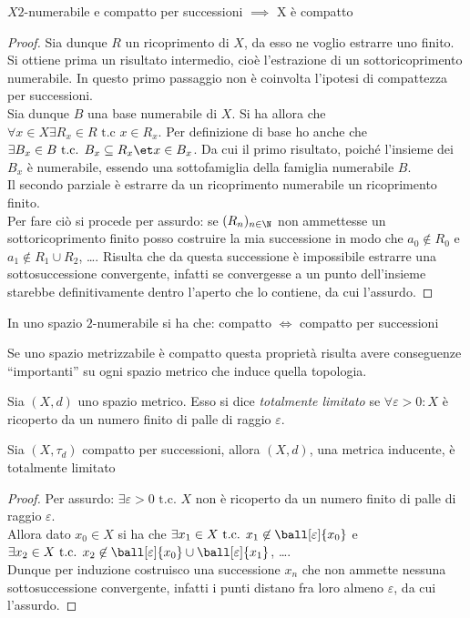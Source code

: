 \begin{prop}
$X 2$-numerabile e compatto per successioni $\implies$ X è compatto
\end{prop}
\begin{proof}
Sia dunque $R$ un ricoprimento di $X$, da esso ne voglio estrarre uno finito.\\
Si ottiene prima un risultato intermedio, cioè l'estrazione di un sottoricoprimento numerabile. In questo primo passaggio non è coinvolta l'ipotesi di compattezza per successioni.\\
Sia dunque $B$ una base numerabile di $X$. Si ha allora che $\forall x\in X \exists R_x \in R \text{ t.c } x\in R_x$. Per definizione di base ho anche che $\exists B_x \in B \text{ t.c. } B_x \subseteq R_x \et x\in B_x$. Da cui il primo risultato, poiché l'insieme dei $B_x$ è numerabile, essendo una sottofamiglia della famiglia numerabile $B$.\\
Il secondo parziale è estrarre da un ricoprimento numerabile un ricoprimento finito.\\
Per fare ciò si procede per assurdo: se $(R_n)_{n\in \N}$ non ammettesse un sottoricoprimento finito posso costruire la mia successione in modo che $a_0 \not \in R_0$ e $a_1 \not \in R_1 \cup R_2$, \dots . Risulta che da questa successione è impossibile estrarre una sottosuccessione convergente, infatti se convergesse a un punto dell'insieme starebbe definitivamente dentro l'aperto che lo contiene, da cui l'assurdo.
\end{proof}

\begin{cor}
In uno spazio $2$-numerabile si ha che: compatto $\iff$ compatto per successioni
\end{cor}

Se uno spazio metrizzabile è compatto questa proprietà risulta avere conseguenze ``importanti'' su ogni spazio metrico che induce quella topologia.

\begin{defn}
Sia $(X,d)$ uno spazio metrico. Esso si dice \emph{totalmente limitato} se $\forall \varepsilon > 0:X$ è ricoperto da un numero finito di palle di raggio $\varepsilon$.
\end{defn}

\begin{prop}
Sia $(X,\tau _d)$ compatto per successioni, allora $(X,d)$, una metrica inducente, è totalmente limitato
\end{prop}
\begin{proof}
Per assurdo: $\exists \varepsilon > 0 \text{ t.c. } X$ non è ricoperto da un numero finito di palle di raggio $\varepsilon$.\\
Allora dato $x_0 \in X$ si ha che $\exists x_1 \in X \text{ t.c. } x_1 \not \in \ball[\varepsilon]{x_0}$ e $\exists x_2 \in X \text{ t.c. } x_2 \not \in \ball[\varepsilon]{x_0} \cup \ball[\varepsilon]{x_1}$, \dots .\\
Dunque per induzione costruisco una successione $x_n$ che non ammette nessuna sottosuccessione convergente, infatti i punti distano fra loro almeno $\varepsilon$, da cui l'assurdo.
\end{proof}

